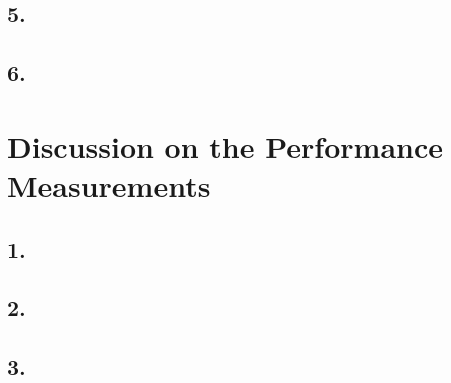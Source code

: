 \documentclass[12pt]{article}
\begin{document}
\subsection*{5.}
\subsection*{6.}
\section*{Discussion on the Performance Measurements}
\subsection*{1.}
\subsection*{2.}
\subsection*{3.}
\end{document}
